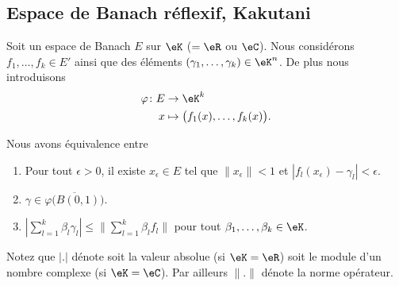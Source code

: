\subsection{Espace de Banach réflexif, Kakutani}

\begin{lemma}	\label{LEMooSBWJooKIfuJj}
	Soit un espace de Banach \( E\) sur \( \eK\) (\( =\eR\) ou \( \eC\)). Nous considérons \( f_1,\ldots,f_k\in E'\) ainsi que des éléments \( (\gamma_1,\ldots,\gamma_k)\in \eK^n\). De plus nous introduisons
	\begin{equation}
		\begin{aligned}
			\varphi\colon E & \to \eK^k                                 \\
			x               & \mapsto \big( f_1(x),\ldots,f_k(x) \big).
		\end{aligned}
	\end{equation}

	Nous avons équivalence entre
	\begin{enumerate}
		\item		\label{ITEMooDMOOooPJtgTE}
		      Pour tout \( \epsilon>0\), il existe \( x_{\epsilon}\in E\) tel que \( \| x_{\epsilon} \|<1\) et \( | f_l(x_{\epsilon})-\gamma_{l} |<\epsilon\).
		\item		\label{ITEMooAQAJooHmSXGW}
		      \( \gamma\in\overline{\varphi\big( B(0,1) \big)}\).
		\item		\label{ITEMooXJKAooFHUsOv}
		      \( | \sum_{l=1}^k\beta_l\gamma_l |\leq \| \sum_{l=1}^k\beta_lf_l \|\) pour tout \( \beta_1,\ldots,\beta_k\in \eK\).
	\end{enumerate}
	Notez que \( | . |\) dénote soit la valeur absolue (si \( \eK=\eR\)) soit le module d'un nombre complexe (si \( \eK=\eC\)). Par ailleurs \( \| . \|\) dénote la norme opérateur.
\end{lemma}

